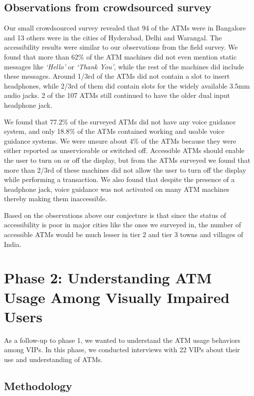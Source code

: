 \subsection{Observations from crowdsourced survey}
\label{ssec:crowdsourcedsurveyobservations}

Our small crowdsourced survey revealed that 94 of the ATMs were in Bangalore and 13 others were in the cities of Hyderabad, Delhi and Warangal. The accessibility results were similar to our observations from the field survey. We found that more than 62\% of the ATM machines did not even mention static messages like \textit{`Hello'} or \textit{`Thank You'}, while the rest of the machines did include these messages. Around 1/3rd of the ATMs did not contain a slot to insert headphones, while 2/3rd of them did contain slots for the widely available 3.5mm audio jacks. 2 of the 107 ATMs still continued to have the older dual input headphone jack.

We found that 77.2\% of the surveyed ATMs did not have any voice guidance system, and only 18.8\% of the ATMs contained working and usable voice guidance systems. We were unsure about 4\% of the ATMs because they were either reported as unserviceable or switched off. Accessible ATMs should enable the user to turn on or off the display, but from the ATMs surveyed we found that more than 2/3rd of these machines did not allow the user to turn off the display while performing a transaction. We also found that despite the presence of a headphone jack, voice guidance was not activated on many ATM machines thereby making them inaccessible.

Based on the observations above our conjecture is that since the status of accessibility is poor in major cities like the ones we surveyed in, the number of accessible ATMs would be much lesser in tier 2 and tier 3 towns and villages of India.

\section{Phase 2: Understanding ATM Usage Among Visually Impaired Users}
\label{sec:phase2understandingatm}
As a follow-up to phase 1, we wanted to understand the ATM usage behaviors among VIPs. In this phase, we conducted interviews with 22 VIPs about their use and understanding of ATMs.

\subsection{Methodology}
\label{ssec:methodology}

